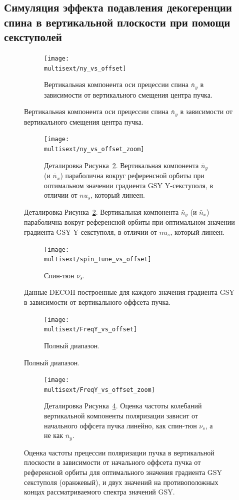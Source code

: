 \documentclass{report}
\newcommand{\home}{/home/alexa}
\newcommand{\Artem}{\home/REPOS/COSYINF/img/Artem}
\newcommand{\multisext}{\Artem/multisext_test}
\begin{document}
\subsection{Симуляция эффекта подавления декогеренции спина в вертикальной плоскости при помощи секступолей}
\begin{figure}[H]
  \centering
  \begin{subfigure}[b]{\textwidth}
    \texttt{[image: \\multisext/ny\_vs\_offset]}
    \caption{Вертикальная компонента оси прецессии спина $\bar n_y$ в зависимости
      от вертикального смещения центра пучка.\label{fig:DECOH_full_ny}}
  \end{subfigure}
\end{figure}
\begin{figure}[H]\ContinuedFloat
  \begin{subfigure}[b]{\textwidth}
    \texttt{[image: \\multisext/ny\_vs\_offset\_zoom]}
    \caption{Деталировка Рисунка~\ref{fig:DECOH_full_ny}. Вертикальная компонента $\bar
      n_y$ (и $\bar n_x$) параболична вокруг референсной орбиты при
      оптимальном значении градиента GSY Y-секступоля, в отличии от
      $nu_s$, который линеен.}
  \end{subfigure}
\end{figure}
\begin{figure}[H]\ContinuedFloat
  \centering
  \begin{subfigure}[b]{\textwidth}
    \texttt{[image: \\multisext/spin\_tune\_vs\_offset]}
    \caption{Спин-тюн $\nu_s$.}
  \end{subfigure}
  \caption{Данные DECOH построенные для каждого значения градиента GSY
    в зависимости от вертикального оффсета пучка.}
\end{figure}

\begin{figure}[H]
  \centering
  \begin{subfigure}[b]{\textwidth}
    \texttt{[image: \\multisext/FreqY\_vs\_offset]}
    \caption{Полный диапазон.\label{fig:FreqY_vs_offset}}
  \end{subfigure}
\end{figure}
\begin{figure}[H]\ContinuedFloat
  \begin{subfigure}[b]{\textwidth}
    \texttt{[image: \\multisext/FreqY\_vs\_offset\_zoom]}
    \caption{Деталировка Рисунка~\ref{fig:FreqY_vs_offset}. Оценка
      частоты колебаний вертикальной компоненты поляризации зависит от
      начального оффсета пучка линейно, как спин-тюн $\nu_s$, а не как $\bar n_y$.}
  \end{subfigure}
  \caption{Оценка частоты прецессии поляризации пучка в вертикальной
    плоскости в зависимости от начального оффсета пучка от референсной
    орбиты для оптимального значения градиента GSY секступоля
    (оранжевый), и двух значений на противоположных концах
    рассматриваемого спектра значений GSY.}
\end{figure}
\end{document}
